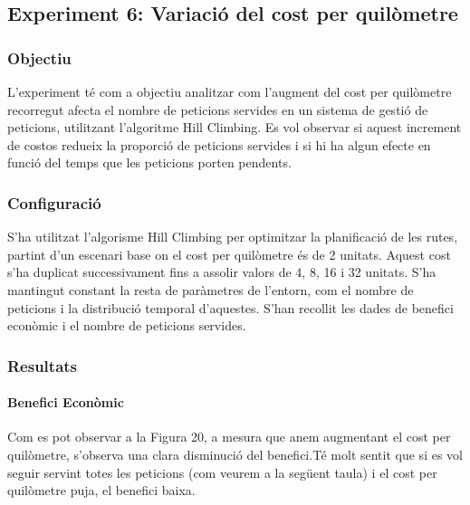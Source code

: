 
\subsection{Experiment 6: Variació del cost per quilòmetre}

\vspace{0.5cm}


\subsubsection{Objectiu}
L'experiment té com a objectiu analitzar com l'augment del cost per quilòmetre recorregut afecta el nombre de peticions servides en un sistema de gestió de peticions, utilitzant l'algoritme Hill Climbing. Es vol observar si aquest increment de costos redueix la proporció de peticions servides i si hi ha algun efecte en funció del temps que les peticions porten pendents.

\vspace{0.5cm}


\subsubsection{Configuració}
S'ha utilitzat l'algorisme Hill Climbing per optimitzar la planificació de les rutes, partint d'un escenari base on el cost per quilòmetre és de 2 unitats. Aquest cost s'ha duplicat successivament fins a assolir valors de 4, 8, 16 i 32 unitats. S'ha mantingut constant la resta de paràmetres de l'entorn, com el nombre de peticions i la distribució temporal d'aquestes. S'han recollit les dades de benefici econòmic i el nombre de peticions servides.

\vspace{0.5cm}


\subsubsection{Resultats}

\paragraph{Benefici Econòmic}
Com es pot observar a la Figura 20, a mesura que anem augmentant el cost per quilòmetre, s'observa una clara disminució del benefici.Té molt sentit que si es vol seguir servint totes les peticions (com veurem a la següent taula) i el cost per quilòmetre puja, el benefici baixa.



